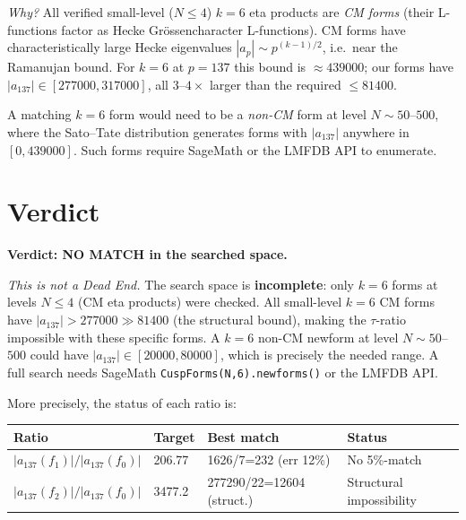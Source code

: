 \documentclass[12pt,a4paper]{article}
\begin{document}
\emph{Why?}  All verified small-level ($N \le 4$) $k=6$ eta products are
\emph{CM forms} (their L-functions factor as Hecke Grössencharacter
L-functions).  CM forms have characteristically large Hecke eigenvalues
$|a_p| \sim p^{(k-1)/2}$, i.e.\ near the Ramanujan bound.  For $k=6$ at
$p=137$ this bound is $\approx 439000$; our forms have $|a_{137}| \in
[277000, 317000]$, all $3$--$4\times$ larger than the required $\le 81400$.

A matching $k=6$ form would need to be a \emph{non-CM} form at level
$N \sim 50$--$500$, where the Sato--Tate distribution generates forms with
$|a_{137}|$ anywhere in $[0, 439000]$.  Such forms require SageMath or
the LMFDB API to enumerate.

\section{Verdict}

\begin{center}
\colorbox{yellow!40}{\parbox{0.85\linewidth}{%
  \textbf{Verdict: NO MATCH in the searched space.}

  \medskip
  \emph{This is not a Dead End.}
  The search space is \textbf{incomplete}:
  only $k=6$ forms at levels $N \le 4$ (CM eta products) were checked.
  All small-level $k=6$ CM forms have $|a_{137}| > 277000 \gg 81400$
  (the structural bound), making the $\tau$-ratio impossible with
  these specific forms.
  A $k=6$ non-CM newform at level $N \sim 50$--$500$ could have
  $|a_{137}| \in [20000, 80000]$, which is precisely the needed range.
  A full search needs SageMath \texttt{CuspForms(N,6).newforms()} or
  the LMFDB API.
}}
\end{center}

\bigskip
\noindent
More precisely, the status of each ratio is:

\begin{center}
\begin{tabular}{llll}
\toprule
Ratio & Target & Best match & Status \\
\midrule
$|a_{137}(f_1)| / |a_{137}(f_0)|$ & 206.77 & 1626/7=232 (err 12\%) & No 5\%-match \\
$|a_{137}(f_2)| / |a_{137}(f_0)|$ & 3477.2 & 277290/22=12604 (struct.) & Structural impossibility \\
\bottomrule
\end{tabular}
\end{center}
\end{document}
